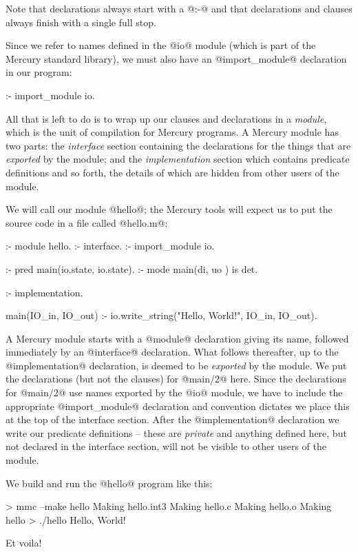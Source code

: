 Note that declarations always start with a @:-@ and that declarations
and clauses always finish with a single full stop.

Since we refer to names defined in the @io@ module (which is part of the
Mercury standard library), we must also have an @import_module@
declaration in our program:
\begin{myverbatim}
:- import_module io.
\end{myverbatim}

All that is left to do is to wrap up our clauses and declarations in a
\emph{module}, which is the unit of compilation for Mercury programs.  A
Mercury module has two parts: the \emph{interface} section containing the
declarations for the things that are \emph{exported} by the module; and the
\emph{implementation} section which contains predicate definitions and so
forth, the details of which are hidden from other users of the module.

We will call our module @hello@; the Mercury tools will expect us to put
the source code in a file called @hello.m@:
\begin{myverbatim}
:- module hello.
:- interface.
:- import_module io.

:- pred main(io.state, io.state).
:- mode main(di,       uo      ) is det.

:- implementation.

main(IO_in, IO_out) :-
    io.write_string("Hello, World!\n", IO_in, IO_out).
\end{myverbatim}
A Mercury module starts with a @module@ declaration giving its name,
followed immediately by an @interface@ declaration.  What follows
thereafter, up to the @implementation@ declaration, is deemed to be
\emph{exported} by the module.  We put the declarations (but not the
clauses) for @main/2@ here.  Since the declarations for @main/2@ use
names exported by the @io@ module, we have to include the appropriate
@import_module@ declaration and convention dictates we place this at the
top of the interface section.  After the @implementation@ declaration we
write our predicate definitions -- these are \emph{private} and anything
defined here, but not declared in the interface section, will not be
visible to other users of the module.

We build and run the @hello@ program like this:
\begin{myverbatim}
> mmc --make hello
  Making hello.int3
  Making hello.c
  Making hello.o
  Making hello
> ./hello
  Hello, World!
\end{myverbatim}
Et voila!

